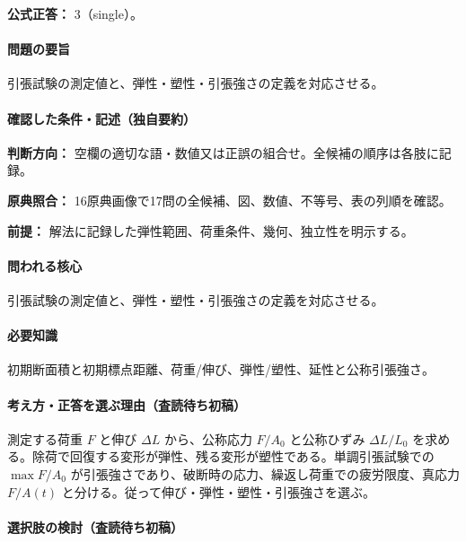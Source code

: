 \textbf{公式正答：} 3（single）。

\paragraph{問題の要旨} 引張試験の測定値と、弾性・塑性・引張強さの定義を対応させる。

\paragraph{確認した条件・記述（独自要約）}\mbox{}\par

\noindent\textbf{判断方向：} 空欄の適切な語・数値又は正誤の組合せ。全候補の順序は各肢に記録。\par

\noindent\textbf{原典照合：} 16原典画像で17問の全候補、図、数値、不等号、表の列順を確認。\par

\noindent\textbf{前提：} 解法に記録した弾性範囲、荷重条件、幾何、独立性を明示する。\par

\paragraph{問われる核心} 引張試験の測定値と、弾性・塑性・引張強さの定義を対応させる。

\paragraph{必要知識} 初期断面積と初期標点距離、荷重/伸び、弾性/塑性、延性と公称引張強さ。

\paragraph{考え方・正答を選ぶ理由（査読待ち初稿）} 測定する荷重 \(F\) と伸び \(\Delta L\) から、公称応力 \(F/A_0\) と公称ひずみ \(\Delta L/L_0\) を求める。除荷で回復する変形が弾性、残る変形が塑性である。単調引張試験での \(\max F/A_0\) が引張強さであり、破断時の応力、繰返し荷重での疲労限度、真応力 \(F/A(t)\) と分ける。従って伸び・弾性・塑性・引張強さを選ぶ。

\paragraph{選択肢の検討（査読待ち初稿）}\mbox{}\par

